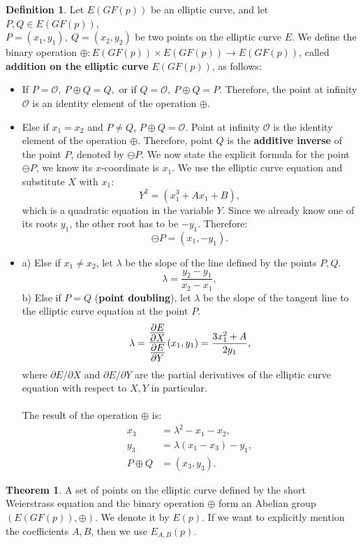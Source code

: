 \documentclass[thesis=M,english]{FITthesis}[2012/10/20]
\theoremstyle{remark}
\theoremstyle{definition}
\newtheorem{DF}{Definition}[section]
\newtheorem{theorem}{Theorem}[section]
\begin{document}
\begin{DF}
Let $E(GF(p))$ be an elliptic curve, and let $P,Q \in E(GF(p)),$\\${P=(x_1,y_1),\ Q=(x_2,y_2)}$ be two points on the elliptic curve $E$. We define the binary operation $\oplus: E(GF(p)) \times E(GF(p)) \to E(GF(p))$, called \textbf{addition on the elliptic curve} $E(GF(p))$, as follows:
\begin{itemize}
\item If $P = \mathcal{O},\ P \oplus Q = Q,$ or if $Q = \mathcal{O},\ P \oplus Q = P.$ Therefore, the point at infinity $\mathcal{O}$ is an identity element of the operation $\oplus$.
\item Else if $x_1 = x_2$ and $P\neq Q$, $P\oplus Q = \mathcal{O}.$ Point at infinity $\mathcal{O}$ is the identity element of the operation $\oplus$. Therefore, point $Q$ is the \textbf{additive inverse} of the point $P$, denoted by $\ominus P$. We now state the explicit formula for the point $\ominus P$, we know its $x$-coordinate is $x_1$. We use the elliptic curve equation and substitute $X$ with $x_1$:
$$
Y^2  = (x_1^3 + Ax_1 + B),
$$
which is a quadratic equation in the variable $Y$. Since we already know one of its roots $y_1$, the other root has to be $-y_1$. Therefore:
$$\ominus P = (x_1, -y_1).$$
\item a) Else if $x_1 \neq x_2$, let $\lambda$ be the slope of the line defined by the points $P,Q.$
$$
\lambda = \frac{y_2 - y_1}{x_2 - x_1},
$$
b) Else if $P = Q$ (\textbf{point doubling}), let $\lambda$ be the slope of the tangent line to the elliptic curve equation at the point $P.$
$$
\lambda = \mathlarger{\mathlarger{\frac{\frac{\partial E}{\partial X}}{\frac{\partial E}{\partial Y}}}}(x_1, y_1) = \frac{3x_1^2+ A}{2y_1}, 
$$
where $\partial E/\partial X$ and  $\partial E/\partial Y$ are the partial derivatives of the elliptic curve equation with respect to $X,Y$ in particular. \\ \\
\noindent The result of the operation $\oplus$ is:
\begin{align*}
x_3 &= \lambda^2 - x_1 - x_2, \\
y_3 &= \lambda(x_1 - x_3) - y_1, \\ 
 P \oplus Q &= (x_3, y_3).
\end{align*}
\end{itemize}
\end{DF}
\begin{theorem}
A set of points on the elliptic curve defined by the short Weierstrass equation and the binary operation $\oplus$ form an Abelian group $(E(GF(p)), \oplus)$. We denote it by $E(p)$. If we want to explicitly mention the coefficients $A,B$, then we use $E_{A,B}(p)$.
\end{theorem}
\end{document}

